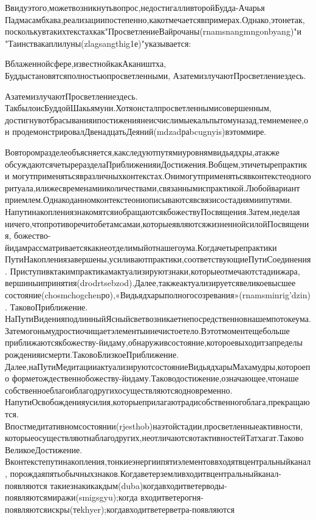 Ввидуэтого,можетвозникнутьвопрос,недостигалливторойБудда-Ачарья
Падмасамбхава,реализациипостепенно,какотмечаетсявпримерах.Однако,этонетак,
посколькувтакихтекстахкак"ПросветлениеВайрочаны(rnamsnangmngonbyang)"и
"Таинствакаплилуны(zlagsangthig1е)"указывается:

Вблаженнойсфере,известнойкакАкаништха,
Буддыстановятсяполностьюпросветленными,
АзатемизлучаютПросветлениездесь.

АзатемизлучаютПросветлениездесь.
ТакбылоисБуддойШакьямуни.Хотяонсталпросветленнымисовершенным,
достигнувотбрасыванияипостижениянеисчислимыекальпытомуназад,темнеменее,он
продемонстрировалДвенадцатьДеяний(mdzadраbcugnyis)вэтоммире.

Вовторомразделеобъясняется,какследуютпутямиуровнямвидьядхры,атакже
обсуждаютсячетыреразделаПриближенияиДостижения.Вобщем,этичетырепрактики
могутприменятьсявразличныхконтекстах.Онимогутприменятьсявконтекстеодного
ритуала,илижесвременамииколичествами,связаннымиспрактикой.Любойвариант
приемлем.Однакоданномконтекстеониописываютсявсвязисостадиямиипутями.
НапутинакоплениязнакомятсяиобращаютсякбожествуПосвящения.Затем,неделая
ничего,чтопротиворечитобетамсамаи,которыеявляютсяжизненнойсилойПосвящения,
божество-йидамрассматриваетсякакнеотделимыйотнашегоума.Когдачетырепрактики
ПутиНакоплениязавершены,усиливаютпрактики,соответствующиеПутиСоединения.
Приступивктакимпрактикамактуализируютзнаки,которыеотмечаютстадиижара,
вершиныипринятия(drodrtsebzod).Далее,такжеактуализируетсявеликоевысшее
состояние(chosmchogchenро),«Видьядхарыполногосозревания»(rnamsminrig'dzin).
ТаковоПриближение.
НаПутиВиденияподлинныйЯсныйсветвозникаетнепосредственновнашемпотокеума.
Затемогоньмудростиочищаетэлементыинечистоетело.Вэтотмоментещебольше
приближаютсякбожеству-йидаму,обнаруживсостояние,котороевыходитзапределы
рожденияисмерти.ТаковоБлизкоеПриближение.
Далее,наПутиМедитацииактуализируютсостояниеВидьядхарыМахамудры,котороепо
форметождественнобожеству-йидаму.Таководостижение,означающее,чтонаше
собственноеблагоиблагодругихосуществляютсяодновременно.
НапутиОсвобожденияусилия,которыеприлагаютрадисобственногоблага,прекращаются.
Впостмедитативномсостоянии(rjesthob)наэтойстадии,просветленныеактивности,
которыеосуществляютнаблагодругих,неотличаютсяотактивностейТатхагат.Таково
ВеликоеДостижение.
Вконтекстепутинакопления,тонкиеэнергиипятиэлементоввходятвцентральныйканал,
порождаяпятьобычныхзнаков.Когдаветерземливходитвцентральныйканал-появляются
такиезнакикакдым(duba)когдавходитветерводы-появляютсямиражи(smigsgyu);когда
входитветерогня-появляютсяискры(теkhyer);когдавходитветерветра-появляются

